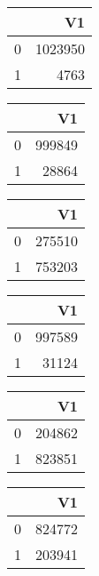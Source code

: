 \bigskip\bigskip
\centering
\begin{tabular}{rr}
  \hline
 & V1 \\ 
  \hline
0 & 1023950 \\ 
  1 & 4763 \\ 
   \hline
\end{tabular}

\bigskip\bigskip
\centering
\begin{tabular}{rr}
  \hline
 & V1 \\ 
  \hline
0 & 999849 \\ 
  1 & 28864 \\ 
   \hline
\end{tabular}

\bigskip\bigskip
\centering
\begin{tabular}{rr}
  \hline
 & V1 \\ 
  \hline
0 & 275510 \\ 
  1 & 753203 \\ 
   \hline
\end{tabular}

\bigskip\bigskip
\centering
\begin{tabular}{rr}
  \hline
 & V1 \\ 
  \hline
0 & 997589 \\ 
  1 & 31124 \\ 
   \hline
\end{tabular}

\bigskip\bigskip
\centering
\begin{tabular}{rr}
  \hline
 & V1 \\ 
  \hline
0 & 204862 \\ 
  1 & 823851 \\ 
   \hline
\end{tabular}

\bigskip\bigskip
\centering
\begin{tabular}{rr}
  \hline
 & V1 \\ 
  \hline
0 & 824772 \\ 
  1 & 203941 \\ 
   \hline
\end{tabular}

